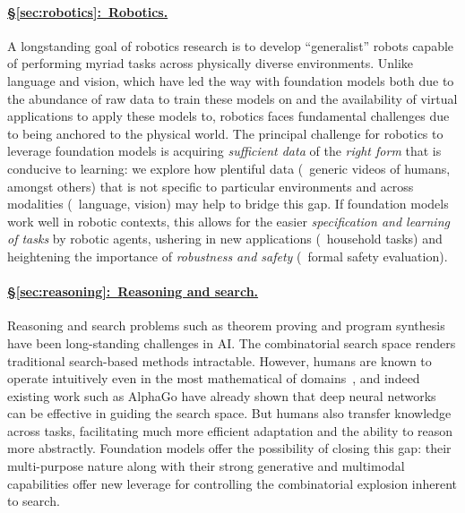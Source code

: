 \paragraph{\hyperref[sec:robotics]{§\ref{sec:robotics}:~Robotics.}}

A longstanding goal of robotics research is to develop ``generalist'' robots capable of performing myriad tasks across physically diverse environments.
Unlike language and vision, which have led the way with foundation models both due to the abundance of raw data to train these models on and the availability of virtual applications to apply these models to, robotics faces fundamental challenges due to being anchored to the physical world.
The principal challenge for robotics to leverage foundation models is acquiring \textit{sufficient data} of the \textit{right form} that is conducive to learning: we explore how plentiful data (\eg~generic videos of humans, amongst others) that is not specific to particular environments and across modalities (\eg~language, vision) may help to bridge this gap.
If foundation models work well in robotic contexts, this allows for the easier \textit{specification and learning of tasks} by robotic agents, ushering in new applications (\eg~household tasks) and heightening the importance of \textit{robustness and safety} (\eg~formal safety evaluation).

\paragraph{\hyperref[sec:reasoning]{§\ref{sec:reasoning}:~Reasoning and search.}}

Reasoning and search problems such as theorem proving and program synthesis have been long-standing challenges in AI. The combinatorial search space renders traditional search-based methods intractable.
However, humans are known to operate intuitively even in the most mathematical of domains~\citep{LakoffNunez00},
and indeed existing work such as AlphaGo have already shown that deep neural networks can be effective in guiding the search space.
But humans also transfer knowledge across tasks, facilitating
much more efficient adaptation and the ability to reason more abstractly.  Foundation models offer the possibility of closing this gap: their multi-purpose nature along with their strong generative and multimodal capabilities offer new leverage for controlling the combinatorial explosion inherent to search.

